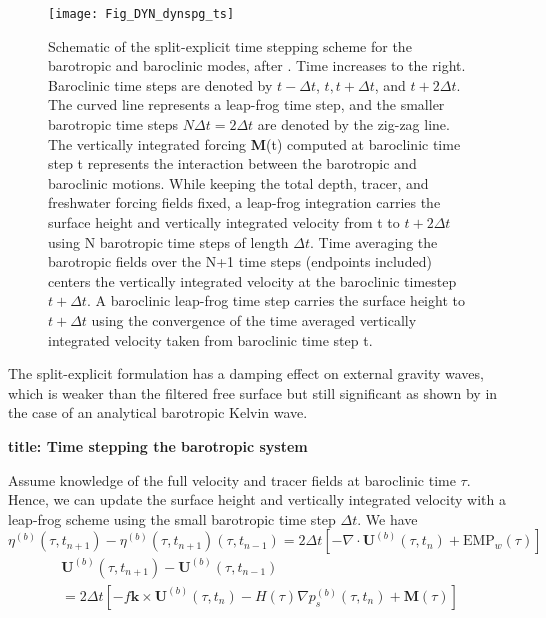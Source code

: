 \documentclass[../tex_main/NEMO_manual]{subfiles}
\begin{document}
\begin{figure}[!t] 	\begin{center}
\texttt{[image: Fig\_DYN\_dynspg\_ts]}
\caption{	 \protect\label{fig:DYN_dynspg_ts}
  Schematic of the split-explicit time stepping scheme for the barotropic and baroclinic modes,
  after \citet{Griffies2004}.
  Time increases to the right.
  Baroclinic time steps are denoted by $t-\Delta t$, $t, t+\Delta t$, and $t+2\Delta t$.
  The curved line represents a leap-frog time step,
  and the smaller barotropic time steps $N \Delta t=2\Delta t$ are denoted by the zig-zag line.
  The vertically integrated forcing \textbf{M}(t) computed at
  baroclinic time step t represents the interaction between the barotropic and baroclinic motions.
  While keeping the total depth, tracer, and freshwater forcing fields fixed,
  a leap-frog integration carries the surface height and vertically integrated velocity from
  t to $t+2 \Delta t$ using N barotropic time steps of length $\Delta t$.
  Time averaging the barotropic fields over the N+1 time steps (endpoints included)
  centers the vertically integrated velocity at the baroclinic timestep $t+\Delta t$.
  A baroclinic leap-frog time step carries the surface height to $t+\Delta t$ using the convergence of
  the time averaged vertically integrated velocity taken from baroclinic time step t. }
\end{center}
\end{figure}

The split-explicit formulation has a damping effect on external gravity waves,
which is weaker than the filtered free surface but still significant as shown by \citet{Levier2007} in
the case of an analytical barotropic Kelvin wave. 


\textbf{title: Time stepping the barotropic system }

Assume knowledge of the full velocity and tracer fields at baroclinic time $\tau$.
Hence, we can update the surface height and vertically integrated velocity with a leap-frog scheme using
the small barotropic time step $\Delta t$.
We have
\begin{equation} \label{eq:DYN_spg_ts_eta}
\eta^{(b)}(\tau,t_{n+1}) - \eta^{(b)}(\tau,t_{n+1}) (\tau,t_{n-1})
	= 2 \Delta t \left[-\nabla \cdot \textbf{U}^{(b)}(\tau,t_n) + \text{EMP}_w(\tau) \right] 
\end{equation}
\begin{multline} \label{eq:DYN_spg_ts_u}
\textbf{U}^{(b)}(\tau,t_{n+1}) - \textbf{U}^{(b)}(\tau,t_{n-1})  \\
	= 2\Delta t \left[ - f \textbf{k} \times \textbf{U}^{(b)}(\tau,t_{n}) 
	- H(\tau) \nabla p_s^{(b)}(\tau,t_{n}) +\textbf{M}(\tau) \right]
\end{multline}
\
\end{document}
